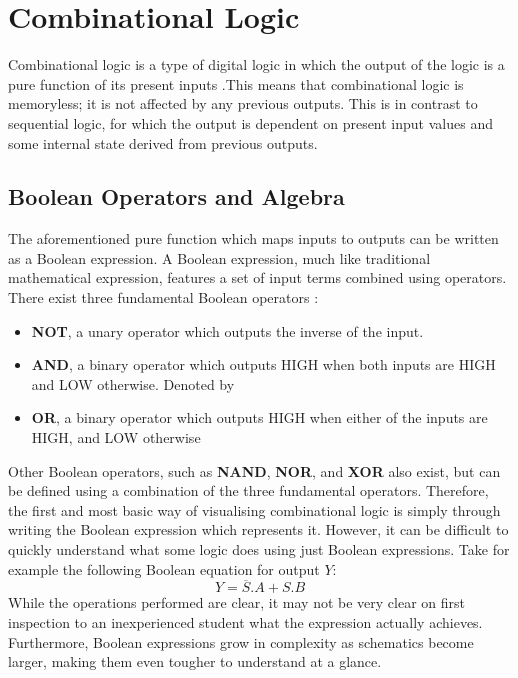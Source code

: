 \section{Combinational Logic}
Combinational logic is a type of digital logic in which the output of the logic is a pure function of its present inputs \cite{comblog_wiki}.This means that combinational logic is memoryless; it is not affected by any previous outputs. This is in contrast to sequential logic, for which the output is dependent on present input values and some internal state derived from previous outputs.

\subsection{Boolean Operators and Algebra}
The aforementioned pure function which maps inputs to outputs can be written as a Boolean expression. A Boolean expression, much like traditional mathematical expression, features a set of input terms combined using operators. There exist three fundamental Boolean operators \cite{gregg_boolean}:
\begin{itemize}
    \item[] \textbf{NOT}, a unary operator which outputs the inverse of the input.
    \item[]\textbf{AND}, a binary operator which outputs HIGH when both inputs are HIGH and LOW otherwise. Denoted by 
    \item[] \textbf{OR}, a binary operator which outputs HIGH when either of the inputs are HIGH, and LOW otherwise
\end{itemize}
Other Boolean operators, such as \textbf{NAND}, \textbf{NOR}, and \textbf{XOR} also exist, but can be defined using a combination of the three fundamental operators.
Therefore, the first and most basic way of visualising combinational logic is simply through writing the Boolean expression which represents it. However, it can be difficult to quickly understand what some logic does using just Boolean expressions. Take for example the following Boolean equation for output $Y$:
\begin{equation}
       Y = \overline{S}.A + S.B
       \label{equ:MuxEq}
\end{equation}
While the operations performed are clear, it may not be very clear on first inspection to an inexperienced student what the expression actually achieves. Furthermore, Boolean expressions grow in complexity as schematics become larger, making them even tougher to understand at a glance.


